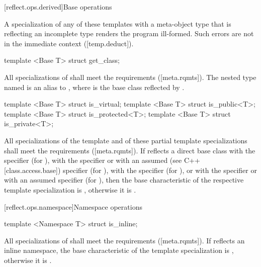 [reflect.ops.derived]{Base operations}

\begin{std.txt}\color{addclr}
A specialization of any of these templates with a meta-object type that is reflecting an incomplete type renders the program ill-formed.
      Such errors are not in the immediate context ([temp.deduct]).

\begin{itemdecl}
template <Base T> struct get_class;
\end{itemdecl}

\begin{itemdescr}
\pnum
All specializations of  shall meet the  requirements ([meta.rqmts]). The nested type named  is an alias to , where  is the base class reflected by .
\end{itemdescr}

\begin{itemdecl}
template <Base T> struct is_virtual;
template <Base T> struct is_public<T>;
template <Base T> struct is_protected<T>;
template <Base T> struct is_private<T>;
\end{itemdecl}

\begin{itemdescr}
\pnum
All specializations of the template and of these partial template specializations shall meet the  requirements ([meta.rqmts]). If  reflects a direct base class with the  specifier (for ), with the  specifier or with an assumed (see C++ [class.access.base])  specifier (for ), with the  specifier (for ), or with the  specifier or with an assumed  specifier (for ), then the base characteristic of the respective template specialization is , otherwise it is .
\end{itemdescr}
\end{std.txt}

[reflect.ops.namespace]{Namespace operations}

\begin{std.txt}\color{addclr}

\begin{itemdecl}
template <Namespace T> struct is_inline;
\end{itemdecl}

\begin{itemdescr}
\pnum
All specializations of  shall meet the  requirements ([meta.rqmts]). If  reflects an inline namespace, the base characteristic of the template specialization is , otherwise it is .

\end{itemdescr}
\end{std.txt}
